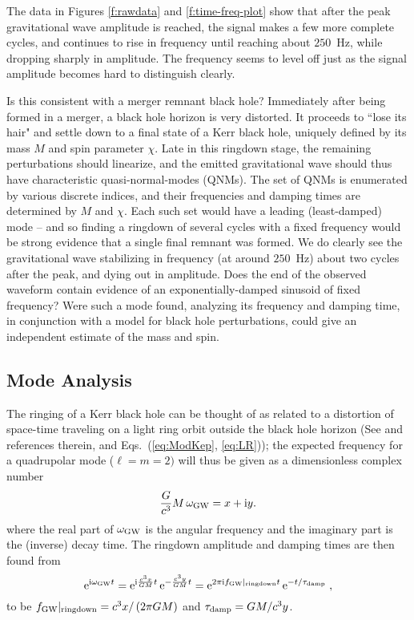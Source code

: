\documentclass{andp2012}%
\def\w{\omega}
\def\e{{\rm e}}
\def\i{{\rm i}}
\def\({\left(}
\def\){\right)}
\newcommand{\inlinecite}[1]{\cite{#1}}
\newcommand{\caveatformat}[1]{\subsection{#1}}
\def\fgw{f_{\rm GW}}
\def\wgw{\w_{\rm GW}}
\def\subRD{|_{\rm ringdown}}
\def\fRD{{\fgw}\subRD}
\def\BH{black hole }		\def\BHs{black holes }			\def\BHns{black hole}		\def\BHsns{black holes}		\def\GW{gravitational wave }		\def\GWs{gravitational waves }				\def\GWns{gravitational wave}		\def\GWsns{gravitational waves}		\def\LR{light ring }		\def\ISCO{innermost stable circular orbit }		\def\NS{neutron star }		\def\NSs{neutron stars }		\def\GR{general relativity }
\newcommand{\CHIRPFMAX}{250} %
\begin{document}
The data in Figures \ref{f:rawdata} and \ref{f:time-freq-plot} show that
after the peak \GW amplitude is reached,
the signal makes a few more complete cycles,
and continues to rise in frequency until reaching
about $\CHIRPFMAX$~Hz,
while dropping sharply in amplitude.
The frequency seems to level off just as the signal amplitude becomes
hard to distinguish clearly.

Is this consistent with a merger remnant \BHns?
Immediately after being formed in a merger, a black hole horizon is
very distorted.
It proceeds to ``lose its hair" and settle down to a final state of a Kerr \BHns, uniquely
defined\cite{NoHair} by its mass $M$ and spin parameter $\chi$.
Late in this ringdown stage, the remaining perturbations should
linearize, and the emitted \GW should thus have characteristic quasi-normal-modes
(QNMs). The set of QNMs is enumerated by various discrete indices, and their
frequencies and damping times are determined by $M$ and $\chi$. Each such set
would have a leading (least-damped) mode --
and so finding a ringdown of several cycles
with a fixed frequency would be strong evidence that a single final remnant was formed.
We do clearly see the \GW stabilizing in frequency (at around $\CHIRPFMAX$~Hz)
about two cycles after the peak, and dying out in amplitude.
Does the end of the observed waveform contain evidence of
an exponentially-damped sinusoid of fixed frequency?
Were such a mode found, analyzing its frequency and damping time,
in conjunction with a model for \BH perturbations,
could give an independent estimate of the mass and spin\cite{Press:1973zz}.

\caveatformat{Mode Analysis}
The ringing of a Kerr \BH can be thought of
as related to a distortion of space-time traveling on a \LR orbit outside
the black hole horizon (See \inlinecite{BertiCardosoWill} and references therein,
and Eqs.\ (\ref{eq:ModKep}, \ref{eq:LR}));
the expected frequency for a quadrupolar mode ($\ell=m=2)$ will thus be
given as a dimensionless complex number
\begin{equation}
\frac{G}{c^3} M \, \wgw = x + \i y.
\end{equation}
where the real part of $\wgw$
is the angular frequency and the imaginary part is the (inverse) decay time.
The ringdown amplitude and damping times are then found from
\begin{equation}
\e^{\i \wgw t } = \e^{\i\frac{c^3x}{GM}t} \, \e^{-\frac{c^3y}{GM}t} 
= \e^{2\pi \i \fRD t}  \, \e^{-t/\tau_{\rm damp}} \; ,
\end{equation}
to be
$\fRD  = c^3x/ \( 2 \pi GM \)$ and $\tau_{\rm damp}= GM/c^3y$.
\end{document}
